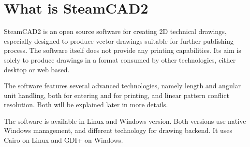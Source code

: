 \pagestyle{empty}
\begin{center}
\vspace*{-2.2cm}
\hspace*{-0.7cm}
\end{center}
\newpage

\pagestyle{headings}

\section{What is SteamCAD2}

SteamCAD2 is an open source software for creating 2D technical drawings, especially designed to 
produce vector drawings suitable for further publishing process. The software itself does not
provide any printing capabilities. Its aim is solely to produce drawings in a format consumed
by other technologies, either desktop or web based.

The software features several advanced technologies, namely length and angular unit handling, both
for entering and for printing, and linear pattern conflict resolution. Both will be explained
later in more details.

The software is available in Linux and Windows version. Both versions use native Windows
management, and different technology for drawing backend. It uses Cairo on Linux and GDI+ on
Windows.

